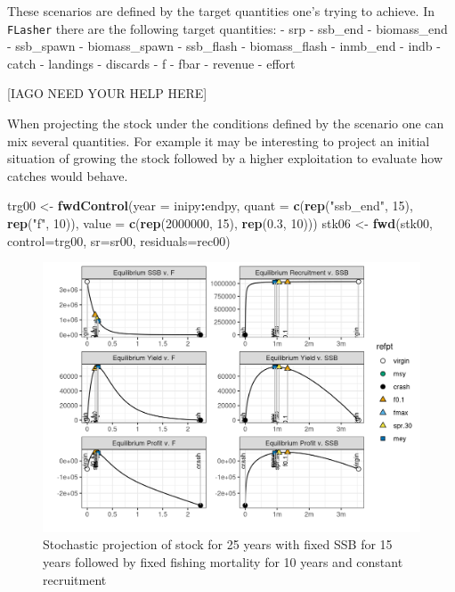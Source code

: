 \documentclass[
]{book}
\newenvironment{Shaded}{\begin{snugshade}}{\end{snugshade}}
\newcommand{\AttributeTok}[1]{\textcolor[rgb]{0.13,0.29,0.53}{#1}}
\newcommand{\DecValTok}[1]{\textcolor[rgb]{0.00,0.00,0.81}{#1}}
\newcommand{\FloatTok}[1]{\textcolor[rgb]{0.00,0.00,0.81}{#1}}
\newcommand{\FunctionTok}[1]{\textcolor[rgb]{0.13,0.29,0.53}{\textbf{#1}}}
\newcommand{\NormalTok}[1]{#1}
\newcommand{\OtherTok}[1]{\textcolor[rgb]{0.56,0.35,0.01}{#1}}
\newcommand{\SpecialCharTok}[1]{\textcolor[rgb]{0.81,0.36,0.00}{\textbf{#1}}}
\newcommand{\StringTok}[1]{\textcolor[rgb]{0.31,0.60,0.02}{#1}}
\begin{document}
These scenarios are defined by the target quantities one's trying to achieve. In \texttt{FLasher} there are the following target quantities:
- srp
- ssb\_end
- biomass\_end
- ssb\_spawn
- biomass\_spawn
- ssb\_flash
- biomass\_flash
- inmb\_end
- indb
- catch
- landings
- discards
- f
- fbar
- revenue
- effort

{[}IAGO NEED YOUR HELP HERE{]}

When projecting the stock under the conditions defined by the scenario one can mix several quantities. For example it may be interesting to project an initial situation of growing the stock followed by a higher exploitation to evaluate how catches would behave.

\begin{Shaded}
\begin{Highlighting}[]
\NormalTok{trg00 }\OtherTok{\textless{}{-}} \FunctionTok{fwdControl}\NormalTok{(}\AttributeTok{year =}\NormalTok{ inipy}\SpecialCharTok{:}\NormalTok{endpy, }\AttributeTok{quant =} \FunctionTok{c}\NormalTok{(}\FunctionTok{rep}\NormalTok{(}\StringTok{"ssb\_end"}\NormalTok{, }\DecValTok{15}\NormalTok{), }\FunctionTok{rep}\NormalTok{(}\StringTok{"f"}\NormalTok{, }\DecValTok{10}\NormalTok{)), }\AttributeTok{value =} \FunctionTok{c}\NormalTok{(}\FunctionTok{rep}\NormalTok{(}\DecValTok{2000000}\NormalTok{, }\DecValTok{15}\NormalTok{), }\FunctionTok{rep}\NormalTok{(}\FloatTok{0.3}\NormalTok{, }\DecValTok{10}\NormalTok{)))}
\NormalTok{stk06 }\OtherTok{\textless{}{-}} \FunctionTok{fwd}\NormalTok{(stk00, }\AttributeTok{control=}\NormalTok{trg00, }\AttributeTok{sr=}\NormalTok{sr00, }\AttributeTok{residuals=}\NormalTok{rec00)}
\end{Highlighting}
\end{Shaded}

\begin{figure}
\centering
\includegraphics{_bookdown_files/_main_files/figure-html/unnamed-chunk-108-1.png}
\caption{\label{fig:unnamed-chunk-108}Stochastic projection of stock for 25 years with fixed SSB for 15 years followed by fixed fishing mortality for 10 years and constant recruitment}
\end{figure}
\end{document}
